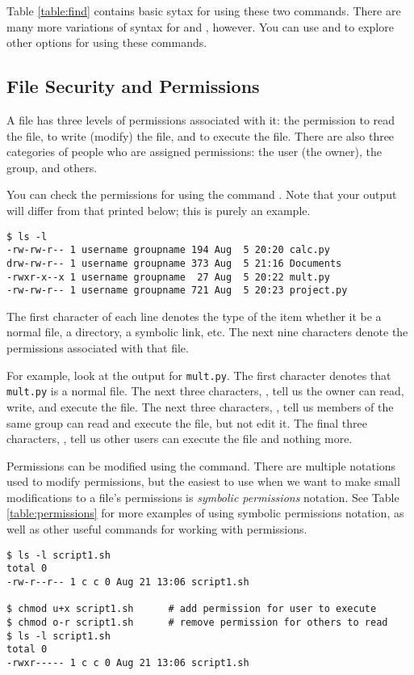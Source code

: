 Table \ref{table:find} contains basic sytax for using these two commands.
There are many more variations of syntax for  and , however.
You can use  and  to explore other options for using these commands.


\subsection*{File Security and Permissions}%
A file has three levels of permissions associated with it: the permission to read the file, to write (modify) the file, and to execute the file.
There are also three categories of people who are assigned permissions: the user (the owner), the group, and others.

You can check the permissions for  using the command .
Note that your output will differ from that printed below; this is purely an example.

\begin{lstlisting}
$ ls -l
-rw-rw-r-- 1 username groupname 194 Aug  5 20:20 calc.py
drw-rw-r-- 1 username groupname 373 Aug  5 21:16 Documents
-rwxr-x--x 1 username groupname  27 Aug  5 20:22 mult.py
-rw-rw-r-- 1 username groupname 721 Aug  5 20:23 project.py
\end{lstlisting}

The first character of each line denotes the type of the item whether it be a normal file, a directory, a symbolic link, etc.
The next nine characters denote the permissions associated with that file.

For example, look at the output for \texttt{mult.py}.
The first character \li{-} denotes that \texttt{mult.py} is a normal file.
The next three characters, , tell us the owner can read, write, and execute the file.
The next three characters, , tell us members of the same group can read and execute the file, but not edit it.
The final three characters, , tell us other users can execute the file and nothing more.

Permissions can be modified using the  command.
There are multiple notations used to modify permissions, but the easiest to use when we want to make small modifications to a file's permissions is \emph{symbolic permissions} notation.
See Table \ref{table:permissions} for more examples of using symbolic permissions notation, as well as other useful commands for working with permissions.
\begin{lstlisting}
$ ls -l script1.sh
total 0
-rw-r--r-- 1 c c 0 Aug 21 13:06 script1.sh

$ chmod u+x script1.sh      # add permission for user to execute
$ chmod o-r script1.sh 		# remove permission for others to read
$ ls -l script1.sh
total 0
-rwxr----- 1 c c 0 Aug 21 13:06 script1.sh
\end{lstlisting}

